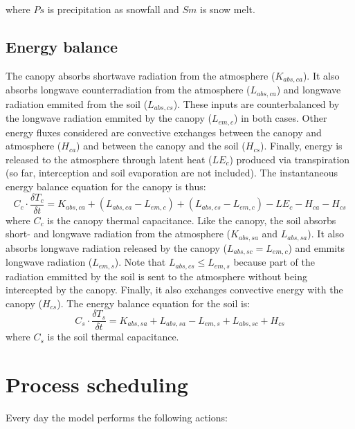 \documentclass[]{book}
\begin{document}
where \(Ps\) is precipitation as snowfall and \(Sm\) is snow melt.

\hypertarget{energy-balance}{%
\subsection{Energy balance}\label{energy-balance}}

The canopy absorbs shortwave radiation from the atmosphere (\(K_{abs,ca}\)). It also absorbs longwave counterradiation from the atmosphere (\(L_{abs,ca}\)) and longwave radiation emmited from the soil (\(L_{abs,cs}\)). These inputs are counterbalanced by the longwave radiation emmited by the canopy (\(L_{em,c}\)) in both cases. Other energy fluxes considered are convective exchanges between the canopy and atmosphere (\(H_{ca}\)) and between the canopy and the soil (\(H_{cs}\)). Finally, energy is released to the atmosphere through latent heat (\(LE_{c}\)) produced via transpiration (so far, interception and soil evaporation are not included). The instantaneous energy balance equation for the canopy is thus:
\begin{equation}
  C_{c} \cdot \frac{\delta T_{c}}{\delta t} = K_{abs,ca} + (L_{abs,ca} - L_{em,c}) + (L_{abs,cs} - L_{em,c}) - LE_{c} - H_{ca} - H_{cs} 
\end{equation}
where \(C_{c}\) is the canopy thermal capacitance. Like the canopy, the soil absorbs short- and longwave radiation from the atmosphere (\(K_{abs,sa}\) and \(L_{abs,sa}\)). It also absorbs longwave radiation released by the canopy (\(L_{abs,sc} = L_{em,c}\)) and emmits longwave radiation (\(L_{em,s}\)). Note that \(L_{abs,cs} \leq L_{em,s}\) because part of the radiation emmitted by the soil is sent to the atmosphere without being intercepted by the canopy. Finally, it also exchanges convective energy with the canopy (\(H_{cs}\)). The energy balance equation for the soil is:
\begin{equation}
  C_{s} \cdot \frac{\delta T_{s}}{\delta t} = K_{abs,sa} + L_{abs,sa} - L_{em,s} + L_{abs,sc} + H_{cs} 
\end{equation}
where \(C_{s}\) is the soil thermal capacitance.

\hypertarget{process-scheduling-1}{%
\section{Process scheduling}\label{process-scheduling-1}}

Every day the model performs the following actions:
\end{document}
